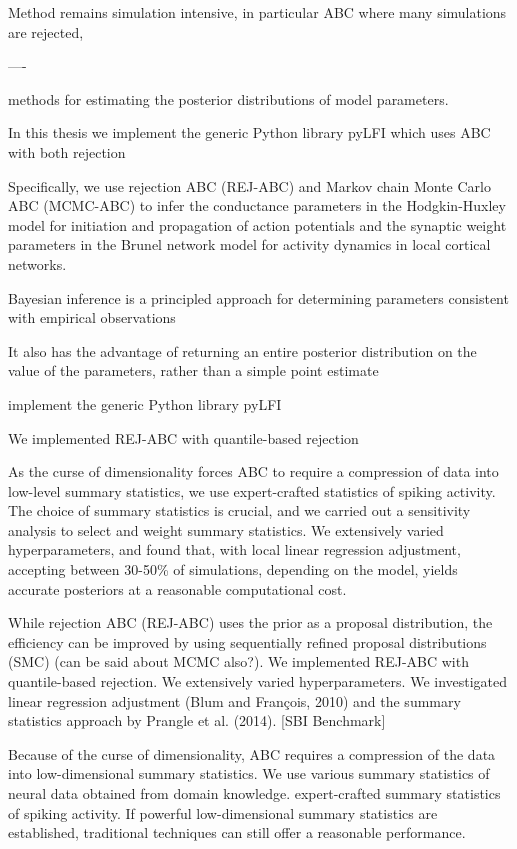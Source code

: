 Method remains simulation intensive, in particular ABC where many simulations are rejected, 

----

 methods for estimating the posterior distributions of model parameters.

In this thesis we implement the generic Python library pyLFI which uses ABC with both rejection

Specifically, we use rejection ABC (REJ-ABC) and Markov chain Monte Carlo ABC (MCMC-ABC) to infer the conductance parameters in the Hodgkin-Huxley model for initiation and propagation of action potentials and the synaptic weight parameters in the Brunel network model for activity dynamics in local cortical networks. 



Bayesian inference is a principled approach for determining parameters consistent with empirical observations


It also has the
advantage of returning an entire posterior distribution on the
value of the parameters, rather than a simple point estimate

implement the generic Python library pyLFI 

We implemented REJ-ABC with quantile-based rejection



As the curse of dimensionality forces ABC to require a compression of data into low-level summary statistics, we use expert-crafted statistics of spiking activity. The choice of summary statistics is crucial, and we carried out a sensitivity analysis to select and weight summary statistics. We extensively varied hyperparameters, and found that, with local linear regression adjustment, accepting between 30-50\% of simulations, depending on the model, yields accurate posteriors at a reasonable computational cost.  



While rejection ABC (REJ-ABC) uses the prior as a proposal distribution, the efficiency can be improved by using sequentially refined proposal distributions (SMC) (can be said about MCMC also?). We implemented REJ-ABC with quantile-based rejection. 
We extensively varied hyperparameters. We investigated linear regression adjustment (Blum and François, 2010) and the summary statistics approach
by Prangle et al. (2014). [SBI Benchmark]



Because of the curse of dimensionality, ABC requires a compression of the data into low-dimensional summary statistics. We use various summary statistics of neural data obtained from domain knowledge.  expert-crafted summary statistics of spiking activity. If powerful low-dimensional summary statistics are established, traditional techniques can still offer a reasonable performance.

